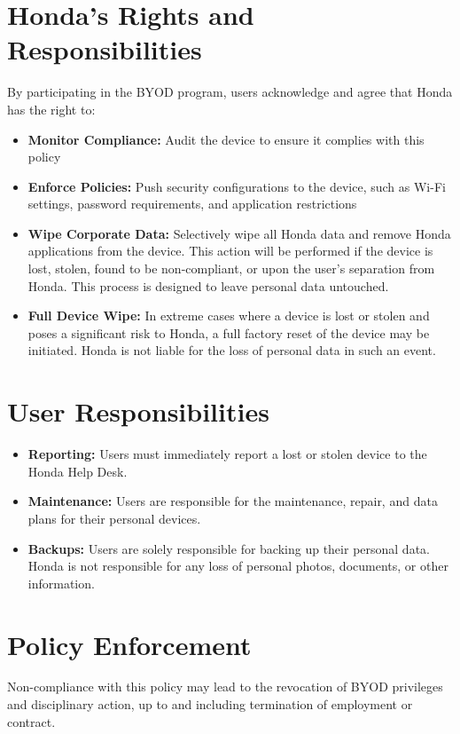 \section{Honda's Rights and Responsibilities}
By participating in the BYOD program, users acknowledge and agree that Honda has the right to:
\begin{itemize}
    \item \textbf{Monitor Compliance:} Audit the device to ensure it complies with this policy
    \item \textbf{Enforce Policies:} Push security configurations to the device, such as Wi-Fi settings, password requirements, and application restrictions
    \item \textbf{Wipe Corporate Data:} Selectively wipe all Honda data and remove Honda applications from the device.  This action will be performed if the device is lost, stolen, found to be non-compliant, or upon the user's separation from Honda. This process is designed to leave personal data untouched.
    \item \textbf{Full Device Wipe:} In extreme cases where a device is lost or stolen and poses a significant risk to Honda, a full factory reset of the device may be initiated.  Honda is not liable for the loss of personal data in such an event.
\end{itemize}
\section{User Responsibilities}
\begin{itemize}
    \item \textbf{Reporting:} Users must immediately report a lost or stolen device to the Honda Help Desk.
    \item \textbf{Maintenance:} Users are responsible for the maintenance, repair, and data plans for their personal devices.
    \item \textbf{Backups:} Users are solely responsible for backing up their personal data. Honda is not responsible for any loss of personal photos, documents, or other information.
\end{itemize}
\section{Policy Enforcement} Non-compliance with this policy may lead to the revocation of BYOD privileges and disciplinary action, up to and including termination of employment or contract.
